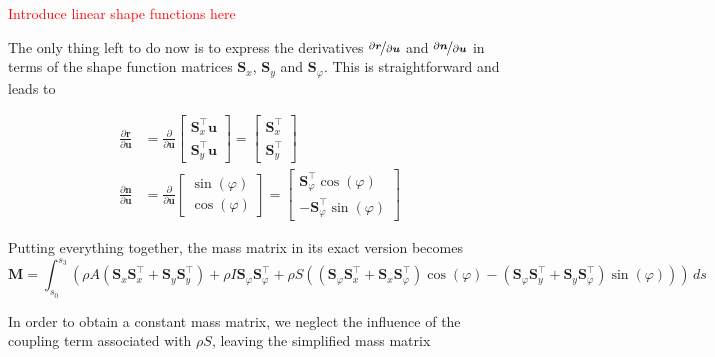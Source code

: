\textcolor{red}{Introduce linear shape functions here}

The only thing left to do now is to express the derivatives $\nicefrac{\partial\boldsymbol{r}}{\partial\boldsymbol{u}}$ and $\nicefrac{\partial\boldsymbol{n}}{\partial\boldsymbol{u}}$ in terms of the shape function matrices $\boldsymbol{S}_x$, $\boldsymbol{S}_y$ and $\boldsymbol{S}_\varphi$.
This is straightforward and leads to

\begin{align}
\frac{\partial\boldsymbol{r}}{\partial\boldsymbol{u}}
&=
\frac{\partial}{\partial\boldsymbol{u}}
\begin{bmatrix}
\boldsymbol{S}_x^\intercal\boldsymbol{u} \\ \boldsymbol{S}_y^\intercal\boldsymbol{u}
\end{bmatrix}
=
\begin{bmatrix}
\boldsymbol{S}_x^\intercal \\ \boldsymbol{S}_y^\intercal
\end{bmatrix}
\\
\frac{\partial\boldsymbol{n}}{\partial\boldsymbol{u}}
&=
\frac{\partial}{\partial\boldsymbol{u}}
\begin{bmatrix}
\sin(\varphi) \\ \cos(\varphi)
\end{bmatrix}
=
\begin{bmatrix}
\boldsymbol{S}_\varphi^\intercal\cos(\varphi) \\ -\boldsymbol{S}_\varphi^\intercal\sin(\varphi)
\end{bmatrix}
\end{align}

Putting everything together, the mass matrix in its exact version becomes
%
\begin{equation}
\boldsymbol{M} = \int_{s_0}^{s_3} \left(\rho A\left(\boldsymbol{S}_x\boldsymbol{S}_x^\intercal + \boldsymbol{S}_y\boldsymbol{S}_y^\intercal\right) + \rho I\boldsymbol{S}_\varphi\boldsymbol{S}_\varphi^\intercal + \rho S\left(\left(\boldsymbol{S}_\varphi\boldsymbol{S}_x^\intercal + \boldsymbol{S}_x\boldsymbol{S}_\varphi^\intercal\right)\cos(\varphi) - \left(\boldsymbol{S}_\varphi\boldsymbol{S}_y^\intercal + \boldsymbol{S}_y\boldsymbol{S}_\varphi^\intercal\right)\sin(\varphi)\right)\right)\,ds
\end{equation}

In order to obtain a constant mass matrix, we neglect the influence of the coupling term associated with $\rho S$, leaving the simplified mass matrix

